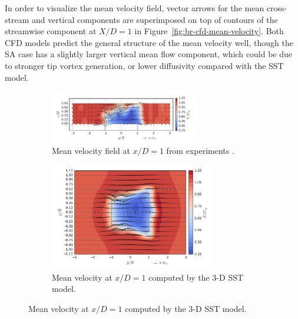 \documentclass[aip,graphicx]{revtex4-1}
\begin{document}
In order to visualize the mean velocity field, vector arrows for the mean
cross-stream and vertical components are superimposed on top of contours of the
streamwise component at $X/D=1$ in Figure~\ref{fig:br-cfd-mean-velocity}. Both
CFD models predict the general structure of the mean velocity well, though the
SA case has a slightly larger vertical mean flow component, which could be due
to stronger tip vortex generation, or lower diffusivity compared with the SST
model.

\begin{figure}
    \centering
    \begin{subfigure}[b]{\textwidth}
        \centering

        \includegraphics[clip, trim=0 0.1in 0.3in 0.2in,
        width=0.72\textwidth]{meancontquiv_exp}

        \caption{Mean velocity field at $x/D=1$ from experiments
            \cite{Bachant2016-RVAT-Re-dep}.}

        \label{fig:br-cfd-meancontquiv-exp}
    \end{subfigure}

    \begin{subfigure}[b]{\textwidth}
        \centering

        \includegraphics[clip, trim=0 0.2in 0 0.15in,
        width=0.8\textwidth]{meancontquiv_kOmegaSST}

        \caption{Mean velocity at $x/D=1$ computed by the 3-D SST model.}

        \label{fig:meancontquiv-SST}
    \end{subfigure}


\end{figure}
\end{document}
